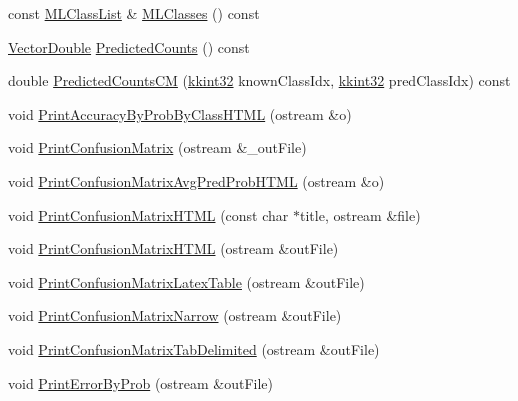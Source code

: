 \begin{DoxyCompactItemize}
\item 
const \hyperlink{class_k_k_m_l_l_1_1_m_l_class_list}{M\+L\+Class\+List} \& \hyperlink{class_k_k_m_l_l_1_1_confusion_matrix2_a3ffbf4a67a233073c85772d5e70b3a82}{M\+L\+Classes} () const 
\item 
\hyperlink{namespace_k_k_b_a5906c207479607e5f450434095914a41}{Vector\+Double} \hyperlink{class_k_k_m_l_l_1_1_confusion_matrix2_ab8b5f2d711849ed4bb98e69bd85517bd}{Predicted\+Counts} () const 
\item 
double \hyperlink{class_k_k_m_l_l_1_1_confusion_matrix2_af3f5627dd13168223482f28cba7d7226}{Predicted\+Counts\+CM} (\hyperlink{namespace_k_k_b_a8fa4952cc84fda1de4bec1fbdd8d5b1b}{kkint32} known\+Class\+Idx, \hyperlink{namespace_k_k_b_a8fa4952cc84fda1de4bec1fbdd8d5b1b}{kkint32} pred\+Class\+Idx) const 
\item 
void \hyperlink{class_k_k_m_l_l_1_1_confusion_matrix2_a26a7f198a4a6e1d60f55bef88ad84a6a}{Print\+Accuracy\+By\+Prob\+By\+Class\+H\+T\+ML} (ostream \&o)
\item 
void \hyperlink{class_k_k_m_l_l_1_1_confusion_matrix2_abedb851741b437ee7897ef73bbeed4c7}{Print\+Confusion\+Matrix} (ostream \&\+\_\+out\+File)
\item 
void \hyperlink{class_k_k_m_l_l_1_1_confusion_matrix2_a2aa0ab4f0a9e3c5bd907e68b94300dc7}{Print\+Confusion\+Matrix\+Avg\+Pred\+Prob\+H\+T\+ML} (ostream \&o)
\item 
void \hyperlink{class_k_k_m_l_l_1_1_confusion_matrix2_aecc46233879a6451a2ce5969933fc4fc}{Print\+Confusion\+Matrix\+H\+T\+ML} (const char $\ast$title, ostream \&file)
\item 
void \hyperlink{class_k_k_m_l_l_1_1_confusion_matrix2_a45ec0f9441983bd3755d60631ce5ace9}{Print\+Confusion\+Matrix\+H\+T\+ML} (ostream \&out\+File)
\item 
void \hyperlink{class_k_k_m_l_l_1_1_confusion_matrix2_afe463b9eec6a478fffbf252a42b54d3f}{Print\+Confusion\+Matrix\+Latex\+Table} (ostream \&out\+File)
\item 
void \hyperlink{class_k_k_m_l_l_1_1_confusion_matrix2_aa5d90a87ce8341055e8cd45913b4ba51}{Print\+Confusion\+Matrix\+Narrow} (ostream \&out\+File)
\item 
void \hyperlink{class_k_k_m_l_l_1_1_confusion_matrix2_a541330f5c7bc79b49347728148876860}{Print\+Confusion\+Matrix\+Tab\+Delimited} (ostream \&out\+File)
\item 
void \hyperlink{class_k_k_m_l_l_1_1_confusion_matrix2_a049e78edf2c94c010218122cdcc5c412}{Print\+Error\+By\+Prob} (ostream \&out\+File)
\item 

\end{DoxyCompactItemize}
